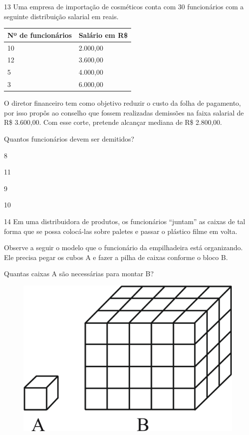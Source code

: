 \num{13} Uma empresa de importação de cosméticos conta com 30 funcionários
com a seguinte distribuição salarial em reais.

\begin{longtable}[]{@{}ll@{}}
\toprule
Nº de funcionários & Salário em R\$\tabularnewline
\midrule
\endhead
10 & 2.000,00\tabularnewline
12 & 3.600,00\tabularnewline
5 & 4.000,00\tabularnewline
3 & 6.000,00\tabularnewline
\bottomrule
\end{longtable}

O diretor financeiro tem como objetivo reduzir o custo da folha de
pagamento, por isso propôs ao conselho que fossem realizadas demissões
na faixa salarial de R\$ 3.600,00. Com esse corte, pretende alcançar
mediana de R\$ 2.800,00.

Quantos funcionários devem ser demitidos?

\begin{escolha}

  \item 8

  \item 11

  \item 9

  \item 10

\end{escolha}

\num{14} Em uma distribuidora de produtos, os funcionários ``juntam'' as
caixas de tal forma que se possa colocá-las sobre paletes e passar o
plástico filme em volta.

Observe a seguir o modelo que o funcionário da empilhadeira está
organizando. Ele precisa pegar os cubos A e fazer a pilha de caixas
conforme o bloco B.

Quantas caixas A são necessárias para montar B?

\begin{figure}[htpb!]
\centering
\includegraphics[width=.5\textwidth]{./ilustras-mat/Simulado_2-atividade_14.png}
\end{figure}

